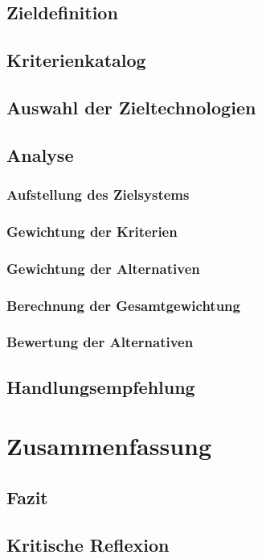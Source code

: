 \section{Zieldefinition}
\section{Kriterienkatalog}
\section{Auswahl der Zieltechnologien}
\section{Analyse}
\subsection{Aufstellung des Zielsystems}
\subsection{Gewichtung der Kriterien}
\subsection{Gewichtung der Alternativen}
\subsection{Berechnung der Gesamtgewichtung}
\subsection{Bewertung der Alternativen}
\section{Handlungsempfehlung}
\chapter{Zusammenfassung}
\section{Fazit} 
\section{Kritische Reflexion}
